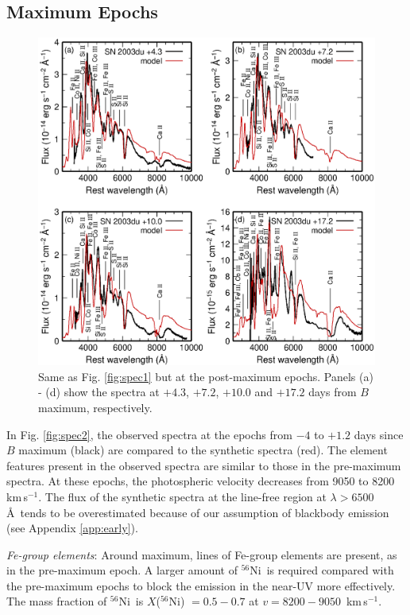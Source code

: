 \documentclass[usegraphicx,usenatbib]{mn2e}
\newcommand{\kms}{\mbox{\,km\,s$^{-1}$}}
\newcommand{\Nifs}{$^{56}$Ni}
\begin{document}
\subsection{Maximum Epochs}


\begin{figure}
  \includegraphics[scale=0.7]{f4.eps}
  \caption{
Same as Fig. \ref{fig:spec1} but at the post-maximum epochs.
Panels (a) - (d) show the spectra at $+4.3$, $+7.2$, $+10.0$ and $+17.2$ days
from $B$ maximum, respectively.
}
\label{fig:spec3}
\end{figure}


In Fig. \ref{fig:spec2}, the observed spectra at the epochs from $-4$ to $+1.2$
days since $B$ maximum (black) are compared to the synthetic spectra (red).
The element features present in the observed spectra are similar to those in the
pre-maximum spectra. At these epochs, the photospheric velocity decreases from
9050 to 8200 \kms. The flux of the synthetic spectra at the line-free region at
$\lambda > 6500$ \AA\ tends to be overestimated because of our assumption of
blackbody emission (see Appendix \ref{app:early}).

{\it Fe-group elements}: Around maximum, lines of Fe-group elements are present,
as in the pre-maximum epoch. A larger amount of \Nifs\ is required compared with
the pre-maximum epochs to block the emission in the near-UV more effectively.
The mass fraction of \Nifs\ is $X$(\Nifs) $= 0.5 - 0.7$ at $v = 8200 - 9050$
\kms.
\end{document}

